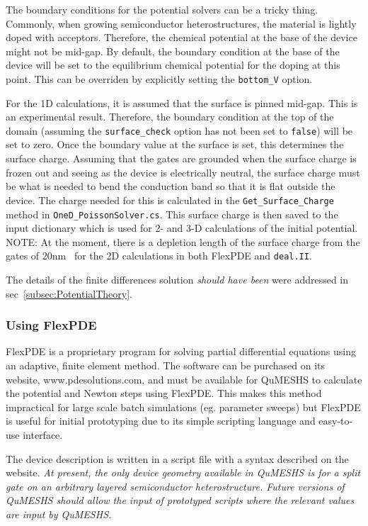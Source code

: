 \documentclass[12pt]{article}
\newcommand{\red}[1]{{\color{red} \it #1}}
\begin{document}
The boundary conditions for the potential solvers can be a tricky thing.  Commonly, when growing
semiconductor heterostructures, the material is lightly doped with acceptors.  Therefore, the
chemical potential at the base of the device might not be mid-gap.  By default, the boundary
condition at the base of the device will be set to the equilibrium chemical potential for the
doping at this point. This can be overriden by explicitly setting the \texttt{bottom\_V} option.

For the 1D calculations, it is assumed that the surface is pinned mid-gap.  This is an
experimental result.  Therefore, the boundary condition at the top of the domain (assuming the
\texttt{surface\_check} option has not been set to \texttt{false}) will be set to zero.  Once
the boundary value at the surface is set, this determines the surface charge.  Assuming that
the gates are grounded when the surface charge is frozen out and seeing as the device is
electrically neutral, the surface charge must be what is needed to bend the conduction band
so that it is flat outside the device.  The charge needed for this is calculated in the
\texttt{Get\_Surface\_Charge} method in \texttt{OneD\_PoissonSolver.cs}.  This surface
charge is then saved to the input dictionary which is used for 2- and 3-D calculations
of the initial potential.  {\color{red} NOTE:} At the moment, there is a depletion length
of the surface charge from the gates of 20nm~\cite{Laux:19??} for the 2D calculations in
both FlexPDE and \texttt{deal.II}.

The details of the finite differences solution \red{should have been} were addressed in
sec~\ref{subsec:PotentialTheory}.


\subsubsection{Using FlexPDE}
\label{subsubsec:UsingFlexPDE}

FlexPDE is a proprietary program for solving partial differential equations using
an adaptive, finite element method.  The software can be purchased on its website,
www.pdesolutions.com, and must be available for QuMESHS to calculate the potential
and Newton steps using FlexPDE.  This makes this method impractical for large scale
batch simulations (eg. parameter sweeps) but FlexPDE is useful for initial prototyping
due to its simple scripting language and easy-to-use interface.

The device description is written in a script file with a syntax described on the
website.  \red{At present, the only device geometry available in QuMESHS is for
a split gate on an arbitrary layered semiconductor heterostructure.  Future versions
of QuMESHS should allow the input of prototyped scripts where the relevant values
are input by QuMESHS.}
\end{document}
